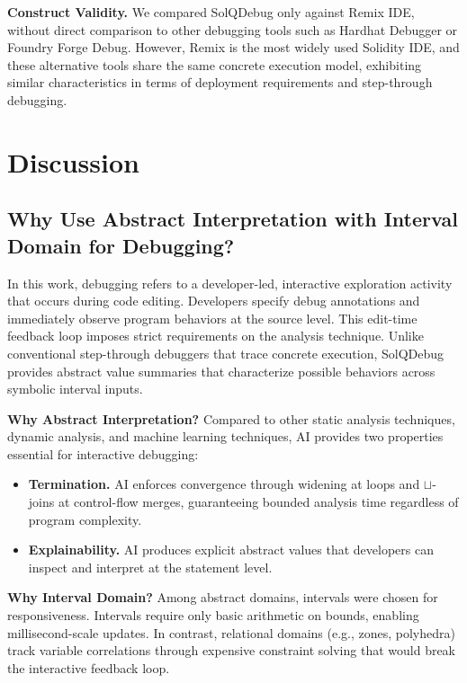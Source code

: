 \documentclass[pdflatex,sn-basic]{sn-jnl}%
\theoremstyle{thmstyleone}%
\theoremstyle{thmstyletwo}%
\theoremstyle{thmstylethree}%
\begin{document}
\smallskip
\noindent\textbf{Construct Validity.}
We compared SolQDebug only against Remix IDE,
without direct comparison to other debugging tools such as Hardhat Debugger or Foundry Forge Debug.
However, Remix is the most widely used Solidity IDE,
and these alternative tools share the same concrete execution model,
exhibiting similar characteristics in terms of deployment requirements and step-through debugging.

\section{Discussion}

\subsection{Why Use Abstract Interpretation with Interval Domain for Debugging?}

In this work, debugging refers to a developer-led, interactive exploration activity that occurs during code editing.
Developers specify debug annotations and immediately observe program behaviors at the source level.
This edit-time feedback loop imposes strict requirements on the analysis technique.
Unlike conventional step-through debuggers that trace concrete execution, SolQDebug provides abstract value summaries that characterize possible behaviors across symbolic interval inputs.

\smallskip
\noindent\textbf{Why Abstract Interpretation?}
Compared to other static analysis techniques, dynamic analysis, and machine learning techniques,
AI provides two properties essential for interactive debugging:
\begin{itemize}
  \item \textbf{Termination.} AI enforces convergence through widening at loops and $\sqcup$-joins at control-flow merges, guaranteeing bounded analysis time regardless of program complexity.

  \item \textbf{Explainability.} AI produces explicit abstract values that developers can inspect and interpret at the statement level.
\end{itemize}

\smallskip
\noindent\textbf{Why Interval Domain?}
Among abstract domains, intervals were chosen for responsiveness. Intervals require only
basic arithmetic on bounds, enabling millisecond-scale updates. In contrast, relational
domains (e.g., zones, polyhedra) track variable correlations through expensive constraint
solving that would break the interactive feedback loop.
\end{document}
